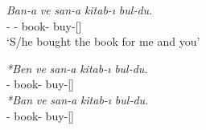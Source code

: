 \begin{exe}
    \ex \label{mariturkish}
    \begin{xlist}
        \ex 
        \gll 
        \textit{Ban-a} \textit{ve} \textit{san-a} \textit{kitab-ı} \textit{bul-du.} \\ {\First}{\Sg}-{\Dat} {\And} {\Second}{\Sg}-{\Dat} book-{\Acc} buy-{\Pst}[{\Third}{\Sg}] \\
        \glt `S/he bought the book for me and you'
        
        \ex 
        \gll 
        \textit{*Ben} \textit{ve} \textit{san-a} \textit{kitab-ı} \textit{bul-du.} \\ {\First}{\Sg} {\And} {\Second}{\Sg}-{\Dat} book-{\Acc} buy-{\Pst}[{\Third}{\Sg}] \\
        
        \ex 
        \gll 
        \textit{*Ban} \textit{ve} \textit{san-a} \textit{kitab-ı} \textit{bul-du.} \\ {\First}{\Sg} {\And} {\Second}{\Sg}-{\Dat} book-{\Acc} buy-{\Pst}[{\Third}{\Sg}] \\
    \end{xlist}
\end{exe}

